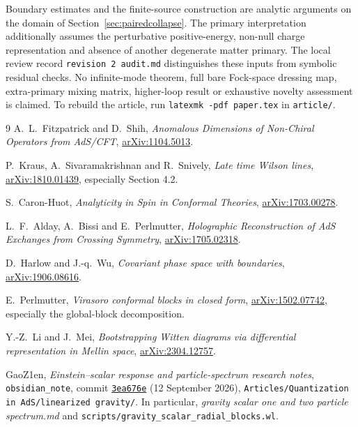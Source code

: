 \documentclass[11pt,a4paper]{article}
\numberwithin{equation}{section}
\theoremstyle{remark}\newtheorem{remark}[theorem]{Remark}
\newcommand{\arxiv}[1]{\href{https://arxiv.org/abs/#1}{arXiv:#1}}
\begin{document}
Boundary estimates and the finite-source construction are analytic arguments on the domain of Section~\ref{sec:pairedcollapse}. The primary interpretation additionally assumes the perturbative positive-energy, non-null charge representation and absence of another degenerate matter primary. The local review record \texttt{revision 2 audit.md} distinguishes these inputs from symbolic residual checks. No infinite-mode theorem, full bare Fock-space dressing map, extra-primary mixing matrix, higher-loop result or exhaustive novelty assessment is claimed. To rebuild the article, run \texttt{latexmk -pdf paper.tex} in \texttt{article/}.

\begin{thebibliography}{9}
A.~L.~Fitzpatrick and D.~Shih,
\emph{Anomalous Dimensions of Non-Chiral Operators from AdS/CFT},
\arxiv{1104.5013}.

P.~Kraus, A.~Sivaramakrishnan and R.~Snively,
\emph{Late time Wilson lines},
\arxiv{1810.01439}, especially Section 4.2.

S.~Caron-Huot,
\emph{Analyticity in Spin in Conformal Theories},
\arxiv{1703.00278}.

L.~F.~Alday, A.~Bissi and E.~Perlmutter,
\emph{Holographic Reconstruction of AdS Exchanges from Crossing Symmetry},
\arxiv{1705.02318}.

D.~Harlow and J.-q.~Wu,
\emph{Covariant phase space with boundaries},
\arxiv{1906.08616}.

E.~Perlmutter,
\emph{Virasoro conformal blocks in closed form},
\arxiv{1502.07742}, especially the global-block decomposition.

Y.-Z.~Li and J.~Mei,
\emph{Bootstrapping Witten diagrams via differential representation in Mellin space},
\arxiv{2304.12757}.

\begingroup\raggedright
GaoZ1en, \emph{Einstein--scalar response and particle-spectrum research notes},
\texttt{obsidian\_note}, commit
\href{https://github.com/GaoZ1en/obsidian_note/commit/3ea676ef5a43cd11a18f551b0adcac222abc8b9a}{\texttt{3ea676e}} (12 September 2026),
\texttt{Articles/Quantization in AdS/linearized gravity/}.
In particular, \emph{gravity scalar one and two particle spectrum.md} and
\texttt{scripts/gravity\_scalar\_radial\_blocks.wl}.
\par\endgroup
\end{thebibliography}
\end{document}
